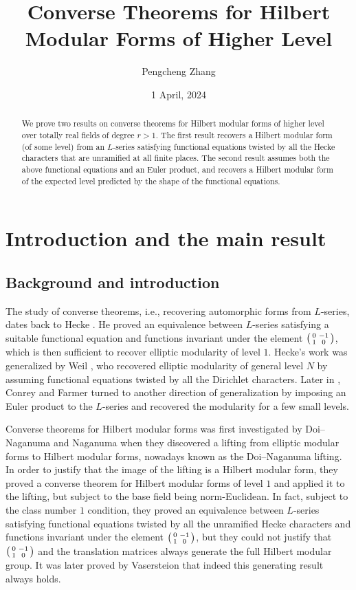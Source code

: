 \documentclass[11pt]{amsart}
\title{Converse Theorems for Hilbert Modular Forms of Higher Level}
\author{Pengcheng Zhang}
\date{1 April, 2024}
\theoremstyle{remark}
\newcommand\sm[1]{\begin{psmallmatrix}#1\end{psmallmatrix}}
\begin{document}
\maketitle

\begin{abstract}
We prove two results on converse theorems for Hilbert modular forms of higher level over totally real fields of degree $r>1$. The first result recovers a Hilbert modular form (of some level) from an $L$-series satisfying functional equations twisted by all the Hecke characters that are unramified at all finite places. The second result assumes both the above functional equations and an Euler product, and recovers a Hilbert modular form of the expected level predicted by the shape of the functional equations.
\end{abstract}

\setcounter{tocdepth}{1}
\tableofcontents

\section{Introduction and the main result}

\subsection{Background and introduction}

The study of converse theorems, i.e., recovering automorphic forms from $L$-series, dates back to Hecke \cite{hecke}. He proved an equivalence between $L$-series satisfying a suitable functional equation and functions invariant under the element $\sm{0&-1\\1&0}$, which is then sufficient to recover elliptic modularity of level $1$. Hecke's work was generalized by Weil \cite{weil}, who recovered elliptic modularity of general level $N$ by assuming functional equations twisted by all the Dirichlet characters. Later in \cite{conreyfarmer}, Conrey and Farmer turned to another direction of generalization by imposing an Euler product to the $L$-series and recovered the modularity for a few small levels. 

Converse theorems for Hilbert modular forms was first investigated by Doi--Naganuma \cite{doinaganuma} and Naganuma \cite{naganuma} when they discovered a lifting from elliptic modular forms to Hilbert modular forms, nowadays known as the Doi--Naganuma lifting. In order to justify that the image of the lifting is a Hilbert modular form, they proved a converse theorem for Hilbert modular forms of level $1$ and applied it to the lifting, but subject to the base field being norm-Euclidean. In fact, subject to the class number $1$ condition, they proved an equivalence between $L$-series satisfying functional equations twisted by all the unramified Hecke characters and functions invariant under the element $\sm{0&-1\\1&0}$, but they could not justify that $\sm{0&-1\\1&0}$ and the translation matrices always generate the full Hilbert modular group. It was later proved by Vasersteion \cite{vaserstein} that indeed this generating result always holds.
\end{document}
